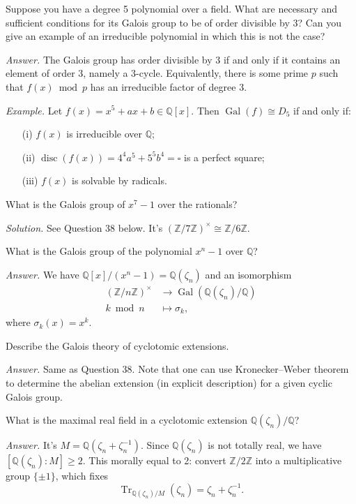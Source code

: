 \documentclass{mathproblems}
\newcommand\Q{\mathbb{Q}}
\newcommand\Z{\mathbb{Z}}
\DeclareMathOperator{\Gal}{Gal}
\DeclareMathOperator{\disc}{disc}
\begin{document}
\begin{questions}
\miquestion
{\color{blue} Suppose you have a degree 5 polynomial over a field. What are necessary and sufficient conditions for its Galois group to be of order divisible by 3? Can you give an example of an irreducible polynomial in which this is not the case?}

\textit{Answer.} The Galois group has order divisible by 3 if and only if it contains an element of order 3, namely a 3-cycle. Equivalently, there is some prime $p$ such that $f(x)\bmod p$ has an irreducible factor of degree 3. 

\textit{Example.} Let $f(x)=x^5+ax+b\in\Q[x]$. Then $\Gal(f)\cong D_5$ if and only if: \vspace{-4pt}
\begin{itemize}
\item[(i)] $f(x)$ is irreducible over $\Q$;

\item[(ii)] $\disc(f(x))=4^4a^5+5^5b^4=\square$ is a perfect square;

\item[(iii)] $f(x)$ is solvable by radicals.
\end{itemize}
\vspace{-4pt}


\miquestion
{\color{blue} What is the Galois group of $x^{7}-1$ over the rationals?}

\textit{Solution.} See Question 38 below. It's $(\Z/7\Z)^\times\cong \Z/6\Z$.

\miquestion
{\color{blue} What is the Galois group of the polynomial $x^{n}-1$ over $\Q$?}

\textit{Answer.} We have $\Q[x]/(x^n-1)=\Q(\zeta_n)$ and an isomorphism
$$
\begin{aligned}
(\Z/n\Z)^\times & \longrightarrow \Gal(\Q(\zeta_n)/\Q) \\
k \bmod n & \longmapsto \sigma_k,
\end{aligned}
$$
where $\sigma_k(x)=x^k$.

\miquestion
{\color{blue} Describe the Galois theory of cyclotomic extensions.}

\textit{Answer.}
Same as Question 38. Note that one can use Kronecker--Weber theorem to determine the abelian extension (in explicit description) for a given cyclic Galois group.

\miquestion
{\color{blue} What is the maximal real field in a cyclotomic extension $\Q(\zeta_{n}) / \Q$?}

\textit{Answer.} It's $M=\Q(\zeta_{n}+\zeta_{n}^{-1})$. Since $\Q(\zeta_{n})$ is not totally real, we have $[\Q(\zeta_{n}):M]\geqslant 2$. This morally equal to 2: convert $\Z/2\Z$ into a multiplicative group $\{\pm 1\}$, which fixes
$$
\operatorname{Tr}_{\Q(\zeta_{n})/M}(\zeta_n)=\zeta_{n}+\zeta_{n}^{-1}.
$$


\end{questions}
\end{document}
